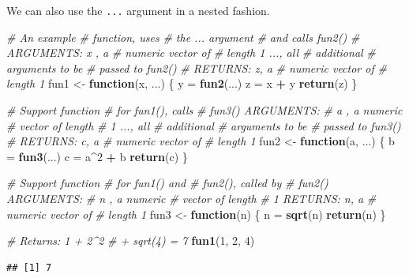 \documentclass[
]{book}
\newenvironment{Shaded}{\begin{snugshade}}{\end{snugshade}}
\newcommand{\CommentTok}[1]{\textcolor[rgb]{0.56,0.35,0.01}{\textit{#1}}}
\newcommand{\ControlFlowTok}[1]{\textcolor[rgb]{0.13,0.29,0.53}{\textbf{#1}}}
\newcommand{\DecValTok}[1]{\textcolor[rgb]{0.00,0.00,0.81}{#1}}
\newcommand{\KeywordTok}[1]{\textcolor[rgb]{0.13,0.29,0.53}{\textbf{#1}}}
\newcommand{\NormalTok}[1]{#1}
\newcommand{\OperatorTok}[1]{\textcolor[rgb]{0.81,0.36,0.00}{\textbf{#1}}}
\newcommand{\StringTok}[1]{\textcolor[rgb]{0.31,0.60,0.02}{#1}}
\begin{document}
We can also use the \texttt{...} argument in a nested fashion.

\begin{Shaded}
\begin{Highlighting}[]
\CommentTok{# An example}
\CommentTok{# function, uses}
\CommentTok{# the ... argument}
\CommentTok{# and calls fun2()}
\CommentTok{# ARGUMENTS: x , a}
\CommentTok{# numeric vector of}
\CommentTok{# length 1 ..., all}
\CommentTok{# additional}
\CommentTok{# arguments to be}
\CommentTok{# passed to fun2()}
\CommentTok{# RETURNS: z, a}
\CommentTok{# numeric vector of}
\CommentTok{# length 1}
\NormalTok{fun1 <-}\StringTok{ }\ControlFlowTok{function}\NormalTok{(x, ...) \{}
\NormalTok{    y =}\StringTok{ }\KeywordTok{fun2}\NormalTok{(...)}
\NormalTok{    z =}\StringTok{ }\NormalTok{x }\OperatorTok{+}\StringTok{ }\NormalTok{y}
    \KeywordTok{return}\NormalTok{(z)}
\NormalTok{\}}

\CommentTok{# Support function}
\CommentTok{# for fun1(), calls}
\CommentTok{# fun3() ARGUMENTS:}
\CommentTok{# a , a numeric}
\CommentTok{# vector of length}
\CommentTok{# 1 ..., all}
\CommentTok{# additional}
\CommentTok{# arguments to be}
\CommentTok{# passed to fun3()}
\CommentTok{# RETURNS: c, a}
\CommentTok{# numeric vector of}
\CommentTok{# length 1}
\NormalTok{fun2 <-}\StringTok{ }\ControlFlowTok{function}\NormalTok{(a, ...) \{}
\NormalTok{    b =}\StringTok{ }\KeywordTok{fun3}\NormalTok{(...)}
\NormalTok{    c =}\StringTok{ }\NormalTok{a}\OperatorTok{^}\DecValTok{2} \OperatorTok{+}\StringTok{ }\NormalTok{b}
    \KeywordTok{return}\NormalTok{(c)}
\NormalTok{\}}

\CommentTok{# Support function}
\CommentTok{# for fun1() and}
\CommentTok{# fun2(), called by}
\CommentTok{# fun2() ARGUMENTS:}
\CommentTok{# n , a numeric}
\CommentTok{# vector of length}
\CommentTok{# 1 RETURNS: n, a}
\CommentTok{# numeric vector of}
\CommentTok{# length 1}
\NormalTok{fun3 <-}\StringTok{ }\ControlFlowTok{function}\NormalTok{(n) \{}
\NormalTok{    n =}\StringTok{ }\KeywordTok{sqrt}\NormalTok{(n)}
    \KeywordTok{return}\NormalTok{(n)}
\NormalTok{\}}

\CommentTok{# Returns: 1 + 2^2}
\CommentTok{# + sqrt(4) = 7}
\KeywordTok{fun1}\NormalTok{(}\DecValTok{1}\NormalTok{, }\DecValTok{2}\NormalTok{, }\DecValTok{4}\NormalTok{)}
\end{Highlighting}
\end{Shaded}

\begin{verbatim}
## [1] 7
\end{verbatim}
\end{document}

